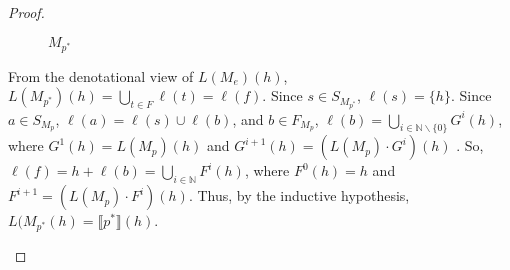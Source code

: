 \documentclass{article}
\newcommand\den[1]{\llbracket #1\rrbracket}
\renewcommand\star{^{\textstyle *}}
\begin{document}
\begin{proof}
\begin{description}
\begin{itemize}
\begin{figure}[H]
    \caption{$M_{p\star}$}
  \end{figure}
  
  From the denotational view of $L(M_e)(h)$,
  $L(M_{p\star})(h) = \bigcup_{t\in F}\ell(t) = \ell(f)$. Since 
  $s \in S_{M_{p\star}}$, $\ell(s) = \{h\}$. Since $a \in S_{M_p}$, 
  $\ell(a) = \ell(s) \cup \ell(b)$, and $b \in F_{M_p}$,
  $\ell(b) = \bigcup_{i \in \mathbb{N} \backslash \{0\}} G^i(h)$, where 
  $G^{1}(h) = L(M_p)(h)$ and $G^{i+1}(h) = (L(M_p) \cdot G^i)(h)$ . So,
  $\ell(f) = {h} + \ell(b) = \bigcup_{i \in \mathbb{N}} F^i(h)$, where 
  $F^{0}(h) = {h}$ and $F^{i+1} = (L(M_p) \cdot F^i)(h)$. Thus, by the
  inductive hypothesis, $L(M_{p\star}(h) = \den{p\star}(h)$.
\end{itemize}
\end{description}
\end{proof}
\end{document}
